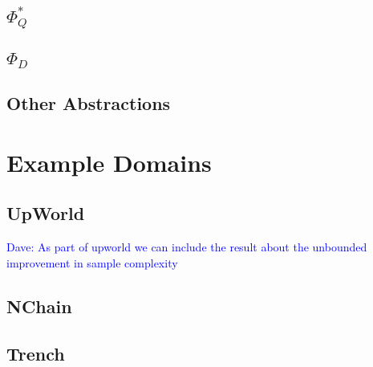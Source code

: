 \documentclass{article}
\newcommand\dnote[1]{\textcolor{blue}{Dave: #1}}
\begin{document}
\subsection{$\Phi_Q^*$}



\subsection{$\Phi_D$}



\subsection{Other Abstractions}




\section{Example Domains}

\subsection{UpWorld}

\dnote{As part of upworld we can include the result about the unbounded improvement in sample complexity}




\subsection{NChain}




\subsection{Trench}

\end{document}
